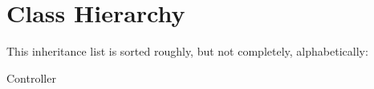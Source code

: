 \section{Class Hierarchy}
This inheritance list is sorted roughly, but not completely, alphabetically\-:\begin{DoxyCompactList}
\item Controller\begin{DoxyCompactList}
\item {}
\end{DoxyCompactList}
\end{DoxyCompactList}

